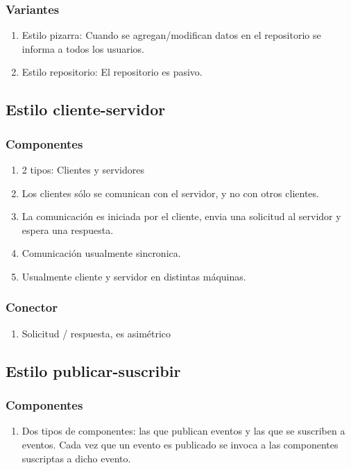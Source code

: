     \subsubsection{Variantes}
    \begin{enumerate}[-]
      \item Estilo pizarra: Cuando se agregan/modifican datos en el repositorio se informa a todos los usuarios.
      \item Estilo repositorio: El repositorio es pasivo.
    \end{enumerate}

  \subsection{Estilo cliente-servidor}

    \subsubsection{Componentes}
    \begin{enumerate}[-]
      \item 2 tipos: Clientes y servidores
      \item Los clientes sólo se comunican con el servidor, y no con otros clientes.
      \item La comunicación es iniciada por el cliente, envia una solicitud al servidor y espera una respuesta.
      \item Comunicación usualmente sincronica.
      \item Usualmente cliente y servidor en distintas máquinas.
    \end{enumerate}

    \subsubsection{Conector}
    \begin{enumerate}[-]
      \item Solicitud / respuesta, es asimétrico
    \end{enumerate}


  \subsection{Estilo publicar-suscribir}
  
    \subsubsection{Componentes}
    \begin{enumerate}[-]
      \item Dos tipos de componentes: las que publican eventos y las que se suscriben a eventos.
            Cada vez que un evento es publicado se invoca a las componentes suscriptas a dicho evento.
    \end{enumerate}

